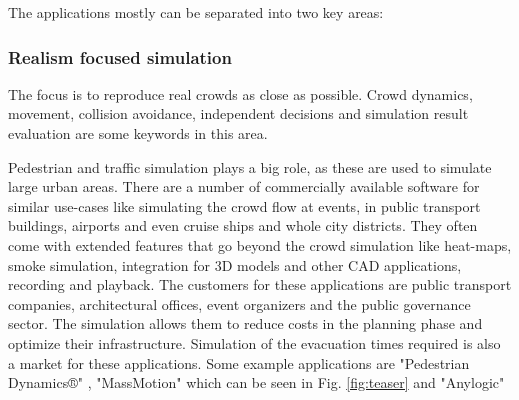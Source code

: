 \documentclass{acmsiggraph}               %
\begin{document}
The applications mostly can be separated into two key areas:

\subsubsection{Realism focused simulation}
The focus is to reproduce real crowds as close as possible. Crowd dynamics, movement, collision avoidance, independent decisions and simulation result evaluation are some keywords in this area. 

Pedestrian and traffic simulation plays a big role, as these are used to simulate large urban areas. There are a number of commercially available software for similar use-cases like simulating the crowd flow at events, in public transport buildings, airports and even cruise ships and whole city districts. They often come with extended features that go beyond the crowd simulation like heat-maps, smoke simulation, integration for 3D models and other CAD applications, recording and playback. The customers for these applications are public transport companies, architectural offices, event organizers and the public governance sector. The simulation allows them to reduce costs in the planning phase and optimize their infrastructure. Simulation of the evacuation times required is also a market for these applications. Some example applications are "Pedestrian Dynamics®" \cite{pedestrian_dynamics_pedestrian_2020}, "MassMotion"  \cite{mediaworks_pedestrian_2020} which can be seen in Fig. \ref{fig:teaser} and "Anylogic" \cite{anylogic_website}


\end{document}
